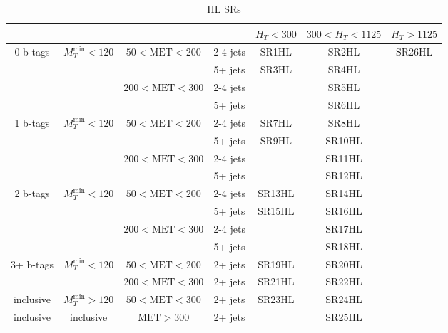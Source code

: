 \documentclass[plain,landscape]{article}
\begin{document}
\begin{table}
\renewcommand{\arraystretch}{1.3}
\centering
\begin{tabular}{|c|c|c|c|c|c|c|}
\hline
& & & & $H_T < 300$ & $300 < H_T < 1125$ & $H_T > 1125$  \\
\hline
\multirow{4}{*}{0 b-tags} &  \multirow{4}{*}{$M_T^{\textrm{min}} < 120$} & \multirow{2}{*}{$50 < \textrm{MET} < 200$} & 2-4 jets & SR1HL & SR2HL & \multirow{17}{*}{SR26HL} \\
\cline{4-6}
& & & 5+ jets & \multirow{3}{*}{SR3HL} & SR4HL & \\
\cline{3-4} \cline{6-6}
& & \multirow{2}{*}{$200 < \textrm{MET} < 300$} &  2-4 jets & &  SR5HL & \\
\cline{4-4} \cline{6-6}
& & & 5+ jets & & SR6HL &  \\
\cline{1-6}
\multirow{4}{*}{1 b-tags} & \multirow{4}{*}{$M_T^{\textrm{min}} < 120$} & \multirow{2}{*}{ $50 < \textrm{MET} < 200$} & 2-4 jets & SR7HL & SR8HL & \\
\cline{4-6}
& & & 5+ jets & \multirow{3}{*}{SR9HL} & SR10HL & \\
\cline{3-4} \cline{6-6}
& & \multirow{2}{*}{ $200 < \textrm{MET} < 300$} &  2-4 jets & &  SR11HL & \\
\cline{4-4} \cline{6-6}
& & & 5+ jets & & SR12HL & \\
\cline{1-6}
\multirow{4}{*}{2 b-tags} & \multirow{4}{*}{$M_T^{\textrm{min}} < 120$} & \multirow{2}{*}{ $50 < \textrm{MET} < 200$} & 2-4 jets & SR13HL &  SR14HL  & \\
\cline{4-6}
& & & 5+ jets & \multirow{3}{*}{SR15HL} & SR16HL &  \\
\cline{3-4} \cline{6-6}
& & \multirow{2}{*}{ $200 <  \textrm{MET} < 300$} &  2-4 jets & & SR17HL & \\
\cline{4-4}  \cline{6-6}
& & & 5+ jets & & SR18HL & \\
\cline{1-6}
\multirow{2}{*}{3+ b-tags} & \multirow{2}{*}{$M_T^{\textrm{min}} < 120$}  & $50 < \textrm{MET} < 200$ & 2+ jets & SR19HL & SR20HL & \\
\cline{3-6} 
& & $200 < \textrm{MET} < 300$ & 2+ jets & SR21HL & SR22HL &  \\
\cline{1-6}
inclusive & $M_T^{\textrm{min}} > 120$ & $50 < \textrm{MET} < 300$  & 2+ jets & SR23HL & SR24HL & \\
\hline
inclusive & inclusive & $\textrm{MET} > 300$ & 2+ jets & \cellcolor{black} & \multicolumn{2}{|c|}{SR25HL}  \\
\hline
\end{tabular}
\caption{HL SRs}
\end{table}
\end{document}

